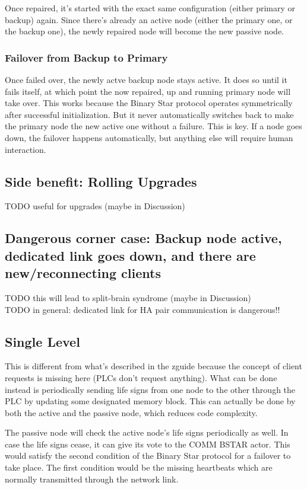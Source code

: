 Once repaired, it's started with the exact same configuration (either primary
or backup) again. Since there's already an active node (either the primary one,
or the backup one), the newly repaired node will become the new passive node.

\subsubsection{Failover from Backup to Primary}
Once failed over, the newly actve backup node stays active. It does so until it
fails itself, at which point the now repaired, up and running primary node will
take over. This works because the Binary Star protocol operates symmetrically
after successful initialization. But it never automatically switches back to
make the primary node the new active one without a failure. This is key. If a
node goes down, the failover happens automatically, but anything else will
require human interaction.

\subsection{Side benefit: Rolling Upgrades}
TODO useful for upgrades (maybe in Discussion)\\

\subsection{Dangerous corner case: Backup node active, dedicated link goes down, and there are new/reconnecting clients}
TODO this will lead to split-brain syndrome (maybe in Discussion)\\
TODO in general: dedicated link for HA pair communication is dangerous!!\\

\subsection{Single Level}
This is different from what's described in the zguide because the concept of
client requests is missing here (PLCs don't request anything).  What can be
done instead is periodically sending life signs from one node to the other
through the PLC by updating some designated memory block. This can actually be
done by both the active and the passive node, which reduces code complexity.

The passive node will check the active node's life signs periodically as well.
In case the life signs cease, it can give its vote to the COMM BSTAR actor.
This would satisfy the second condition of the Binary Star protocol for a
failover to take place. The first condition would be the missing heartbeats
which are normally transmitted through the network link.

